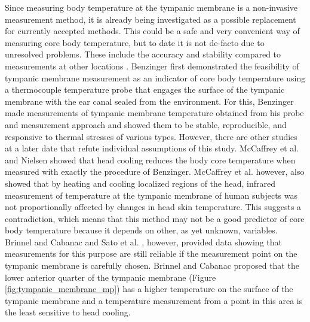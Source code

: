 Since measuring body temperature at the tympanic membrane is a non-invasive measurement method, it is already being investigated as a possible replacement for currently accepted methods.
This could be a safe and very convenient way of measuring core body temperature, but to date it is not de-facto due to unresolved problems.
These include the accuracy and stability compared to measurements at other locations \cite{maxtonEstimatingCoreTemperature2004, fulbrookCoreBodyTemperature1997, mumaComparisonRectalAxillary1991, rothAgreementRectalTympanic1996}.
Benzinger \cite{benzingerHeatRegulationHomeostasis1969, benzingerClinicalTemperatureNew1969, benzingerPhysicalHeatRegulation1959} first demonstrated the feasibility of tympanic membrane measurement as an indicator of core body temperature using a thermocouple temperature probe that engages the surface of the tympanic membrane with the ear canal sealed from the environment.
For this, Benzinger made measurements of tympanic membrane temperature obtained from his probe and measurement approach and showed them to be stable, reproducible, and responsive to thermal stresses of various types.
However, there are other studies at a later date that refute individual assumptions of this study.
McCaffrey et al. \cite{mccaffreyEffectHeadSkin1975} and Nielsen \cite{nielsenNaturalCoolingBrain1988} showed that head cooling reduces the body core temperature when measured with exactly the procedure of Benzinger.
McCaffrey et al. however, also showed that by heating and cooling localized regions of the head, infrared measurement of temperature at the tympanic membrane of human subjects was not proportionally affected by changes in head skin temperature.
This suggests a contradiction, which means that this method may not be a good predictor of core body temperature because it depends on other, as yet unknown, variables.
Brinnel and Cabanac \cite{brinnelTympanicTemperatureCore1989} and Sato et al. \cite{satoReexaminationTympanicMembrane1996}, however, provided data showing that measurements for this purpose are still reliable if the measurement point on the tympanic membrane is carefully chosen. 
Brinnel and Cabanac proposed that the lower anterior quarter of the tympanic membrane (Figure \ref{fig:tympanic_membrane_mp}) has a higher temperature on the surface of the tympanic membrane and a temperature measurement from a point in this area is the least sensitive to head cooling.
